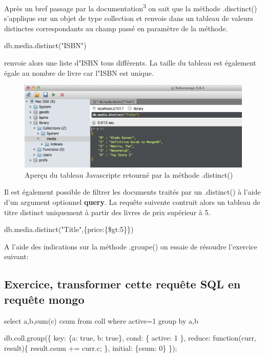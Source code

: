 \par Après un bref passage par la documentation\textsuperscript{3} on sait que la méthode .disctinct() s'applique sur un objet de type collection et renvoie dans un tableau de valeurs distinctes correspondants au champ passé en paramètre de la méthode. \begin{tt} db.media.distinct("ISBN") \end{tt} renvoie alors une liste d"ISBN tous différents. La taille du tableau est également égale au nombre de livre car l"ISBN est unique.
    
    \begin{figure}[h!]
    \centering
    \includegraphics[scale=0.5]{img/distinct.png}
    \caption{Aperçu du tableau Javascripte retourné par la méthode .distinct()}
    \end{figure}
    
    \par Il est également possible de filtrer les documents traités par un .distinct() à l'aide d'un argument optionnel \textbf{query}. La requête suivente contruit alors un tableau de titre distinct uniquement à partir des livres de prix supérieur à 5.\newline
    
    \begin{tt} db.media.distinct("Title",\{price:\{\$gt:5\}\})\end{tt} \newline
    A l'aide des indications sur la méthode .groupe() on essaie de résoudre l'exercice suivant:
    
    \subsection{Exercice, transformer cette requête SQL en requête mongo}
    
    select a,b,sum(c) csum from coll where active=1 group by a,b \newline \newline
    \begin{tt} db.coll.group(\{ key: \{a: true, b: true\},\newline
    \indent cond: \{ active: 1 \}, \newline
    \indent reduce: function(curr, result)\{ \newline
    \indent \indent result.csum += curr.c; \newline
    \indent\}, \newline
    initial: \{csum: 0\} \newline
    \}); \newline \end{tt}
    
{\let\thefootnote\relax{}}
